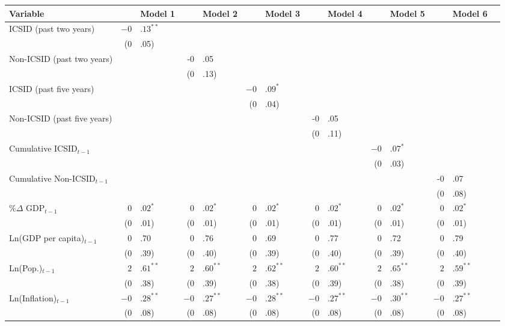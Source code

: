 \documentclass[12pt,onesided]{amsart}
\begin{document}
\begin{table}[ht]
\centering
{\footnotesize
\begin{tabular}{lr@{} lr@{}lr@{}lr@{} lr@{}lr@{}lr@{} }
 Variable && Model 1 && Model 2 && Model 3 && Model 4 && Model 5 && Model 6 \\ 
  \hline
\hline
ICSID (past two years) & $-0$&$.13^{\ast\ast}$ &&  &&  &&  &&  &&  \\ 
   & (0&.05) &&  &&  &&  &&  &&  \\ 
  Non-ICSID (past two years) &&  & -0&.05 &&  &&  &&  &&  \\ 
   &&  & (0&.13) &&  &&  &&  &&  \\ 
  ICSID (past five years) &&  &&  & $-0$&$.09^{\ast}$ &&  &&  &&  \\ 
   && &&  & (0&.04) &&  &&  &&  \\ 
  Non-ICSID (past five years) &&  &&  &&  & -0&.05 &&  &&  \\ 
   &&  &&  &&  & (0&.11) &&  &&  \\    
  Cumulative ICSID$_{t-1}$ &&  &&  &&  &&  & $-0$&$.07^{\ast}$ &&  \\ 
   &&  &&  &&  &&  & (0&.03) &&  \\ 
  Cumulative Non-ICSID$_{t-1}$ &&  &&  &&  &&  &&  & -0&.07 \\ 
   && &&  &&  &&  &&  & (0&.08) \\    
  \%$\Delta$ GDP$_{t-1}$ & $0$&$.02^{\ast}$ & $0$&$.02^{\ast}$ & $0$&$.02^{\ast}$ & $0$&$.02^{\ast}$ & $0$&$.02^{\ast}$ & $0$&$.02^{\ast}$ \\ 
   & (0&.01) & (0&.01) & (0&.01) & (0&.01) & (0&.01) & (0&.01) \\ 
  Ln(GDP per capita)$_{t-1}$ & 0&.70 & 0&.76 & 0&.69 & 0&.77 & 0&.72 & 0&.79 \\ 
   & (0&.39) & (0&.40) & (0&.39) & (0&.40) & (0&.39) & (0&.40) \\ 
  Ln(Pop.)$_{t-1}$ & $2$&$.61^{\ast\ast}$ & $2$&$.60^{\ast\ast}$ & $2$&$.62^{\ast\ast}$ & $2$&$.60^{\ast\ast}$ & $2$&$.65^{\ast\ast}$ & $2$&$.59^{\ast\ast}$ \\ 
   & (0&.38) & (0&.39) & (0&.38) & (0&.39) & (0&.38) & (0&.39) \\ 
  Ln(Inflation)$_{t-1}$ & $-0$&$.28^{\ast\ast}$ & $-0$&$.27^{\ast\ast}$ & $-0$&$.28^{\ast\ast}$ & $-0$&$.27^{\ast\ast}$ & $-0$&$.30^{\ast\ast}$ & $-0$&$.27^{\ast\ast}$ \\ 
   & (0&.08) & (0&.08) & (0&.08) & (0&.08) & (0&.08) & (0&.08) \\ 

\end{tabular}}
\end{table}
\end{document}
